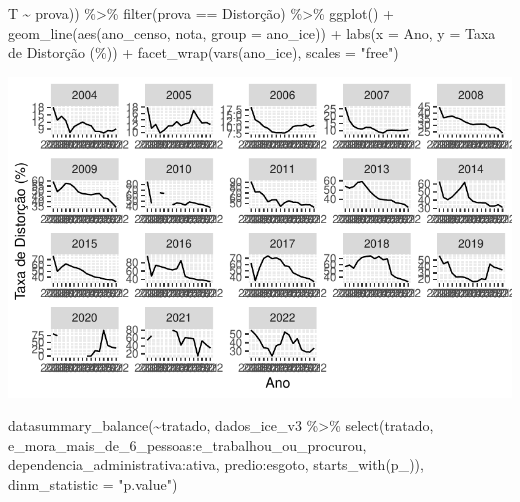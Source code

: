\documentclass[
  letterpaper,
  DIV=11,
  numbers=noendperiod]{scrartcl}
\newenvironment{Shaded}{\begin{snugshade}}{\end{snugshade}}
\newcommand{\AttributeTok}[1]{\textcolor[rgb]{0.40,0.45,0.13}{#1}}
\newcommand{\FunctionTok}[1]{\textcolor[rgb]{0.28,0.35,0.67}{#1}}
\newcommand{\NormalTok}[1]{\textcolor[rgb]{0.00,0.23,0.31}{#1}}
\newcommand{\SpecialCharTok}[1]{\textcolor[rgb]{0.37,0.37,0.37}{#1}}
\newcommand{\StringTok}[1]{\textcolor[rgb]{0.13,0.47,0.30}{#1}}
\begin{document}
\begin{Shaded}
\begin{Highlighting}[]
\NormalTok{                         T }\SpecialCharTok{\textasciitilde{}}\NormalTok{ prova)) }\SpecialCharTok{\%\textgreater{}\%} 
  \FunctionTok{filter}\NormalTok{(prova }\SpecialCharTok{==} \StringTok{\textquotesingle{}Distorção\textquotesingle{}}\NormalTok{) }\SpecialCharTok{\%\textgreater{}\%} 
  \FunctionTok{ggplot}\NormalTok{() }\SpecialCharTok{+}
  \FunctionTok{geom\_line}\NormalTok{(}\FunctionTok{aes}\NormalTok{(ano\_censo, nota, }\AttributeTok{group =}\NormalTok{ ano\_ice)) }\SpecialCharTok{+}
  \FunctionTok{labs}\NormalTok{(}\AttributeTok{x =} \StringTok{\textquotesingle{}Ano\textquotesingle{}}\NormalTok{, }\AttributeTok{y =} \StringTok{\textquotesingle{}Taxa de Distorção (\%)\textquotesingle{}}\NormalTok{) }\SpecialCharTok{+}
  \FunctionTok{facet\_wrap}\NormalTok{(}\FunctionTok{vars}\NormalTok{(ano\_ice), }\AttributeTok{scales =} \StringTok{"free"}\NormalTok{)}
\end{Highlighting}
\end{Shaded}

\includegraphics{script_files/figure-latex/unnamed-chunk-12-4.pdf}

\begin{Shaded}
\begin{Highlighting}[]
\FunctionTok{datasummary\_balance}\NormalTok{(}\SpecialCharTok{\textasciitilde{}}\NormalTok{tratado, dados\_ice\_v3 }\SpecialCharTok{\%\textgreater{}\%} 
                      \FunctionTok{select}\NormalTok{(tratado, e\_mora\_mais\_de\_6\_pessoas}\SpecialCharTok{:}\NormalTok{e\_trabalhou\_ou\_procurou,}
\NormalTok{                             dependencia\_administrativa}\SpecialCharTok{:}\NormalTok{ativa, predio}\SpecialCharTok{:}\NormalTok{esgoto,}
                             \FunctionTok{starts\_with}\NormalTok{(}\StringTok{\textquotesingle{}p\_\textquotesingle{}}\NormalTok{)),}
                    \AttributeTok{dinm\_statistic =} \StringTok{"p.value"}\NormalTok{)}
\end{Highlighting}
\end{Shaded}
\end{document}
